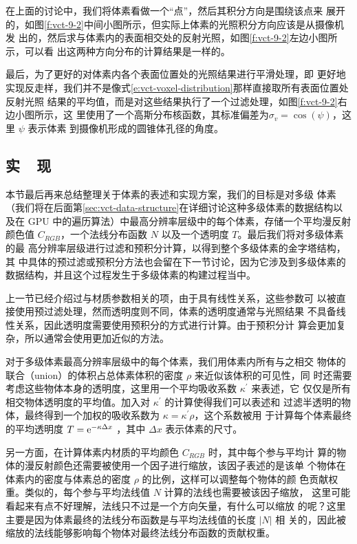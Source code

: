 在上面的讨论中，我们将体素看做一个“点”，然后其积分方向是围绕该点来 展开的，如图\ref{f:vct-9-2}中间小图所示，但实际上体素的光照积分方向应该是从摄像机发 出的，然后求与体素内的表面相交处的反射光照，如图\ref{f:vct-9-2}左边小图所示，可以看 出这两种方向分布的计算结果是一样的。

最后，为了更好的对体素内各个表面位置处的光照结果进行平滑处理，即 更好地实现反走样，我们并不是像式\ref{e:vct-voxel-distribution}那样直接取所有表面位置处反射光照 结果的平均值，而是对这些结果执行了一个过滤处理，如图\ref{f:vct-9-2}右边小图所示，这 里使用了一个高斯分布核函数，其标准偏差为$\sigma_v= \cos(\psi)$，这里 $\psi$ 表示体素 到摄像机形成的圆锥体孔径的角度。




\subsection{实~~现}\label{sec:vct-implementation}
本节最后再来总结整理关于体素的表述和实现方案，我们的目标是对多级 体素（我们将在后面第\ref{sec:vct-data-structure}在详细讨论这种多级体素的数据结构以及在 GPU 中的遍历算法）中最高分辨率层级中的每个体素，存储一个平均漫反射颜色值 $C_{RGB}$，一个法线分布函数 $N$ 以及一个透明度 $T$。最后我们将对多级体素的最 高分辨率层级进行过滤和预积分计算，以得到整个多级体素的金字塔结构，其 中具体的预过滤或预积分方法也会留在下一节讨论，因为它涉及到多级体素的 数据结构，并且这个过程发生于多级体素的构建过程当中。

上一节已经介绍过与材质参数相关的项，由于具有线性关系，这些参数可 以被直接使用预过滤处理，然而透明度则不同，体素的透明度通常与光照结果 不具备线性关系，因此透明度需要使用预积分的方式进行计算。由于预积分计 算会更加复杂，所以通常会使用更加近似的方法。

对于多级体素最高分辨率层级中的每个体素，我们用体素内所有与之相交 物体的联合（union）的体积占总体素体积的密度 $\rho$ 来近似该体积的可见性，同 时还需要考虑这些物体本身的透明度，这里用一个平均吸收系数 $\kappa^{'}$  来表述，它 仅仅是所有相交物体透明度的平均值。加入对 $\kappa^{'}$ 的计算使得我们可以表述和 过滤半透明的物体，最终得到一个加权的吸收系数为 $\kappa =\kappa^{'} \rho$，这个系数被用 于计算每个体素最终的平均透明度 $T = {\rm e}^{-\kappa\Delta x}$ ，其中 $\Delta x$ 表示体素的尺寸。

另一方面，在计算体素内材质的平均颜色 $C_{RGB}$ 时，其中每个参与平均计 算的物体的漫反射颜色还需要被使用一个因子进行缩放，该因子表述的是该单 个物体在体素内的密度与体素总的密度 $\rho$ 的比例，这样可以调整每个物体的颜 色贡献权重。类似的，每个参与平均法线值 $N$ 计算的法线也需要被该因子缩放， 这里可能看起来有点不好理解，法线只不过是一个方向矢量，有什么可以缩放 的呢？这里主要是因为体素最终的法线分布函数是与平均法线值的长度 $|N|$ 相 关的，因此被缩放的法线能够影响每个物体对最终法线分布函数的贡献权重。

